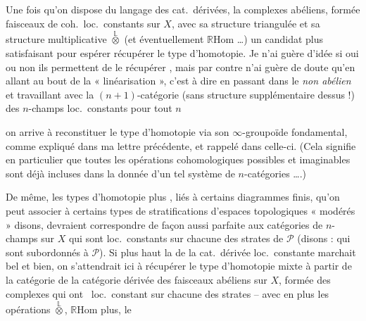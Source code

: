 \documentclass[11pt,a4paper]{article}
\begin{document}
Une fois qu'on dispose du langage des cat.\ dérivées, la  complexes abéliens, formée  faisceaux de coh.\ loc.\ constants sur $X$, avec sa structure triangulée et sa structure multiplicative $\overset{\mathbb{L}}{\otimes}$ (et éventuellement $\mathbb{R}\mathrm{Hom}$ …)  un candidat plus satisfaisant pour espérer récupérer le type d'homotopie. Je n'ai guère d'idée si oui ou non ils permettent de le récupérer , mais par contre n'ai guère de doute qu'en allant au bout de la « linéarisation », c'est à dire en passant dans le \emph{non abélien} et travaillant avec la $(n+1)$-catégorie (sans structure supplémentaire dessus !) des $n$-champs loc.\ constants \struck{\ill{}} pour tout $n$

on arrive à reconstituer le type d'homotopie via son $\infty$-groupoïde fondamental, comme expliqué dans ma lettre précédente, et rappelé dans celle-ci. (Cela signifie en particulier que toutes les opérations cohomologiques possibles et imaginables sont déjà incluses dans la donnée d'un tel système de $n$-catégories ….) 

De même, les types d'homotopie plus , liés à certains diagrammes finis, qu'on peut associer à certains types de stratifications  d'espaces topologiques « modérés »  disons, devraient correspondre de façon aussi parfaite aux catégories de $n$-champs sur $X$ qui sont loc.\ constants sur chacune des strates de $\mathcal{P}$ (disons : qui sont subordonnés à $\mathcal{P}$). Si plus haut la \ill{} de la cat.\ dérivée loc.\ constante marchait bel et bien, on s'attendrait ici à récupérer le type d'homotopie mixte à partir de la catégorie de la catégorie dérivée des faisceaux abéliens sur $X$, formée des complexes qui ont \ loc.\ constant sur chacune des strates -- avec en plus les opérations $\overset{\mathbb{L}}{\otimes}$, $\mathbb{R}\mathrm{Hom}$ plus, le
\end{document}
